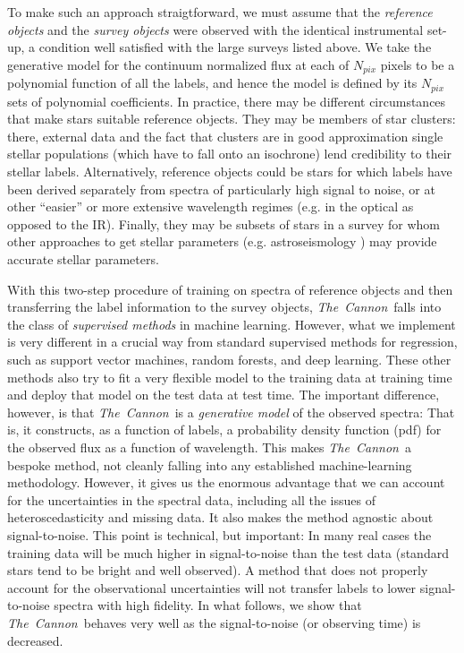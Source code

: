 \documentclass[12pt, preprint]{aastex}
\newcommand{\tc}{\textsl{The~Cannon}}
\begin{document}
To make such an approach straigtforward, we must assume that the \textit{reference objects} and the \textit{survey objects} were observed with the identical instrumental set-up, a condition well satisfied with the large surveys listed above. 
We take the generative model for the continuum normalized flux at each of $N_{pix}$ pixels to be a polynomial function of all the labels, and hence the model is defined by its $N_{pix}$ sets of polynomial coefficients. In practice, there may be different circumstances that make stars suitable reference objects. 
They may be members of star clusters: there, external data and the fact that clusters are in good approximation single stellar populations (which have to fall onto an isochrone) lend credibility to their stellar labels. 
Alternatively, reference objects could be stars for which labels have been derived separately from spectra of particularly high signal to noise, or at other ``easier'' or more extensive wavelength regimes (e.g. in the optical as opposed to the IR). 
Finally, they may be subsets of stars in a survey  for whom other approaches to get stellar parameters (e.g. astroseismology ) may provide accurate stellar parameters.

With this two-step procedure of training on spectra of reference objects and then transferring the label information to the survey objects, \tc\ falls into the class of \emph{supervised methods} in machine learning. 
However, what we implement is very different in a crucial way from standard supervised methods for regression, such as support vector machines, random forests, and deep learning.
These other methods also try to fit a very flexible model to the training data at training time
and deploy that model on the test data at test time.
The important difference, however, is that \tc\ is a \emph{generative model} of the observed spectra:
That is, it constructs, as a function of labels, a probability density function (pdf) for the observed
flux as a function of wavelength. 
This makes \tc\ a bespoke method, not cleanly falling into any established machine-learning methodology.
However, it gives us the enormous advantage that we can account for the uncertainties in the spectral data,
including all the issues of heteroscedasticity and missing data.
It also makes the method agnostic about signal-to-noise.
This point is technical, but important:
In many real cases the training data will be much higher in signal-to-noise than the test data
(standard stars tend to be bright and well observed).
A method that does not properly account for the observational uncertainties will not transfer labels to lower signal-to-noise spectra with high fidelity.
In what follows, we show that \tc\ behaves very well as the signal-to-noise (or observing time) is decreased.
\end{document}
